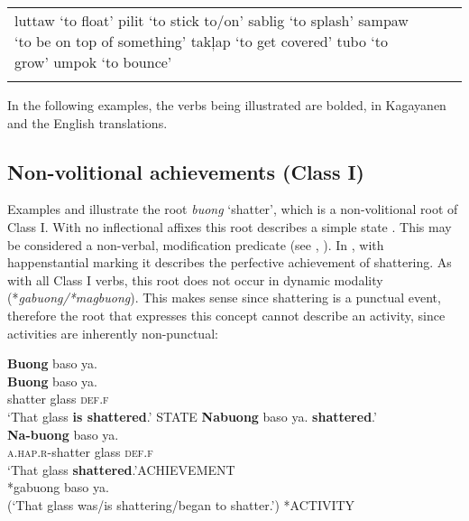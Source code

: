\begin{table}
{\begin{tabular}{
        >{\RaggedRight\arraybackslash}p{4cm}
        >{\RaggedRight\arraybackslash}p{4.1cm}
        >{\RaggedRight\arraybackslash}p{4cm}
                    }
luttaw ‘to float’ \newline
pilit ‘to stick to/on’ \newline
sablig ‘to splash’ \newline
sampaw ‘to be on top of something’ \newline
takļap  ‘to get covered’ \newline
tubo ‘to grow’ \newline
umpok ‘to bounce’ \\
\lspbottomrule
    \end{tabular} 
    }
\end{table}
In the following examples, the verbs being illustrated are bolded, in Kagayanen and the English translations. 
\subsection{Non-volitional achievements (Class I)}

Examples  and  illustrate the root \textit{buong} ‘shatter’, which is a non-volitio\-nal root of Class I.  With no  inflectional affixes this root describes a simple state . This may be considered a non-verbal, modification predicate (see , ). In , with happenstantial marking it describes the perfective achievement of shattering. As with all Class I verbs, this root does not occur in dynamic modality (*\textit{gabuong/*magbuong}). This makes sense since shattering is a punctual event, therefore the root that expresses this concept cannot describe an activity, since activities are inherently non-punctual:

\ea
\label{bkm:Ref398301852}
\textbf{Buong} baso  ya.\\\smallskip
\gll \textbf{Buong}    baso  ya. \\
shatter  glass  \textsc{def.f} \\
\glt `That glass \textbf{is shattered}.' \hspace{1cm}STATE
\z
\ea
\label{bkm:Ref398301854}
\textbf{Nabuong}  baso  ya. \textbf{shattered}.’ \\\smallskip
\gll \textbf{Na-buong}  baso  ya. \\
\textsc{a.hap.r}-shatter  glass  \textsc{def.f} \\
\glt `That glass \textbf{shattered}.'\hspace{1cm}ACHIEVEMENT \\\smallskip
*gabuong baso ya. \\
(‘That glass was/is shattering/began to shatter.’) *ACTIVITY
\z

